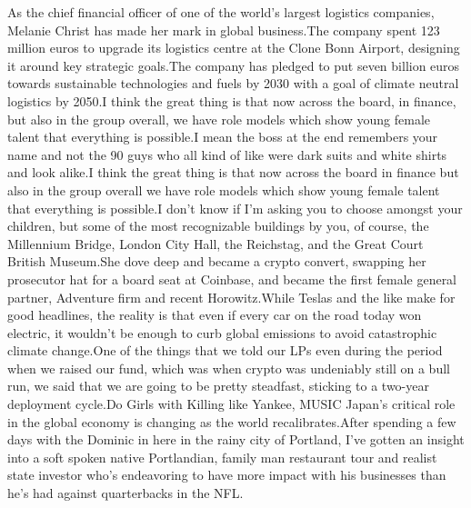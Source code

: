 \documentclass{article}%
\begin{document}
As the chief financial officer of one of the world's largest logistics companies, Melanie Christ has made her mark in global business.The company spent 123 million euros to upgrade its logistics centre at the Clone Bonn Airport, designing it around key strategic goals.The company has pledged to put seven billion euros towards sustainable technologies and fuels by 2030 with a goal of climate neutral logistics by 2050.I think the great thing is that now across the board, in finance, but also in the group overall, we have role models which show young female talent that everything is possible.I mean the boss at the end remembers your name and not the 90 guys who all kind of like were dark suits and white shirts and look alike.I think the great thing is that now across the board in finance but also in the group overall we have role models which show young female talent that everything is possible.I don't know if I'm asking you to choose amongst your children, but some of the most recognizable buildings by you, of course, the Millennium Bridge, London City Hall, the Reichstag, and the Great Court British Museum.She dove deep and became a crypto convert, swapping her prosecutor hat for a board seat at Coinbase, and became the first female general partner, Adventure firm and recent Horowitz.While Teslas and the like make for good headlines, the reality is that even if every car on the road today won electric, it wouldn't be enough to curb global emissions to avoid catastrophic climate change.One of the things that we told our LPs even during the period when we raised our fund, which was when crypto was undeniably still on a bull run, we said that we are going to be pretty steadfast, sticking to a two{-}year deployment cycle.Do Girls with Killing like Yankee,  MUSIC Japan's critical role in the global economy is changing as the world recalibrates.After spending a few days with the Dominic in here in the rainy city of Portland, I've gotten an insight into a soft spoken native Portlandian, family man restaurant tour and realist state investor who's endeavoring to have more impact with his businesses than he's had against quarterbacks in the NFL.%
\end{document}
